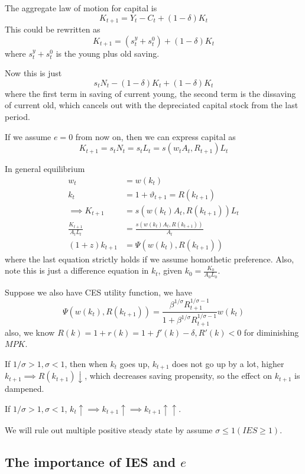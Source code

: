 \documentclass[twocolumn, fleqn]{article}
\begin{document}
		The aggregate law of motion for capital is
		\begin{equation*}
			K_{t+1} = Y_t - C_t + (1-\delta)K_t
		\end{equation*}
		This could be rewritten as \[K_{t+1}=(s_t^y+s_t^0)+(1-\delta)K_t\]
		where $s_t^y+s_t^0$ is the young plus old saving.

		Now this is just \[s_t N_t - (1-\delta)K_t + (1-\delta)K_t\]
		where the first term in saving of current young, the second term is the dissaving of current old, which
		cancels out with the depreciated capital stock from the last period.

		If we assume $e=0$ from now on, then we can express capital as 
		\[K_{t+1}=s_t N_t = s_t L_t = s(w_t A_t, R_{t+1})L_t\]
	
		In general equilibrium
		\begin{align*}
			w_t &= w(k_t) \\
			k_t &= 1 + \vartheta_{t+1} = R(k_{t+1})\\
			\implies K_{t+1} &= s(w(k_t)A_t, R(k_{t+1}))L_t\\
			\frac{K_{t+1}}{A_t L_t} &= \frac{s(w(k_t)A_t, R(k_{t+1}))}{A_t}\\
			(1+z)k_{t+1} &= \Psi(w(k_t),R(k_{t+1}))
		\end{align*}
		where the last equation strictly holds if we assume homothetic preference.
		Also, note this is just a difference equation in $k_t$, given $k_0 =\frac{K_0}{A_0L_0}$.

		Suppose we also have CES utility function, we have
		\[\Psi(w(k_t),R(k_{t+1}))=\frac{\beta^{1/\sigma}R_{t+1}^{1/\sigma-1}}{1+\beta^{1/\sigma}R_{t+1}^{1/\sigma-1}}w(k_t)\]
		also, we know $R(k) = 1+r(k)= 1+f'(k)-\delta, R'(k)<0$ for diminishing $MPK$.

		If $1/\sigma >1, \sigma <1$, then when $k_t$ goes up, $k_{t+1}$ does not go up by a lot, higher $k_{t+1} \implies R(k_{t+1})\downarrow
		$, which decreases saving propensity, so the effect on $k_{t+1}$ is dampened.

		If $1/\sigma >1, \sigma <1$, $k_t \uparrow \implies k_{t+1} \uparrow \implies k_{t+1} \uparrow \uparrow$.

		We will rule out multiple positive steady state by assume $\sigma \leq 1 (IES \geq 1)$.

		\subsection{The importance of IES and $e$}\label{subsec:importance-of-ies}
\end{document}
